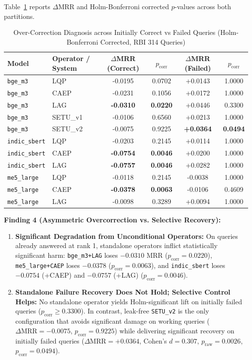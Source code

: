 \documentclass[conference]{IEEEtran}
\begin{document}
Table~\ref{tab:overcorrection} reports $\Delta\text{MRR}$ and Holm-Bonferroni corrected $p$-values across both partitions.

\begin{table}[t]
\caption{Over-Correction Diagnosis across Initially Correct vs Failed Queries (Holm-Bonferroni Corrected, RBI 314 Queries)}
\label{tab:overcorrection}
\centering
\begin{tabular}{llcccc}
\toprule
Model & Operator / System & $\Delta$MRR (Correct) & $p_{\text{corr}}$ & $\Delta$MRR (Failed) & $p_{\text{corr}}$ \\
\midrule
\texttt{bge\_m3} & LQP & -0.0195 & 0.0702 & +0.0143 & 1.0000 \\
\texttt{bge\_m3} & CAEP & -0.0231 & 0.1056 & +0.0172 & 1.0000 \\
\texttt{bge\_m3} & LAG & \textbf{-0.0310} & \textbf{0.0220} & +0.0446 & 0.3300 \\
\texttt{bge\_m3} & SETU\_v1 & -0.0106 & 0.6560 & +0.0213 & 1.0000 \\
\texttt{bge\_m3} & SETU\_v2 & -0.0075 & 0.9225 & \textbf{+0.0364} & \textbf{0.0494} \\
\midrule
\texttt{indic\_sbert} & LQP & -0.0203 & 0.2145 & +0.0114 & 1.0000 \\
\texttt{indic\_sbert} & CAEP & \textbf{-0.0754} & \textbf{0.0046} & +0.0200 & 1.0000 \\
\texttt{indic\_sbert} & LAG & \textbf{-0.0757} & \textbf{0.0046} & +0.0282 & 1.0000 \\
\midrule
\texttt{me5\_large} & LQP & -0.0118 & 0.2145 & -0.0038 & 1.0000 \\
\texttt{me5\_large} & CAEP & \textbf{-0.0378} & \textbf{0.0063} & -0.0106 & 0.4609 \\
\texttt{me5\_large} & LAG & -0.0098 & 0.3289 & +0.0094 & 1.0000 \\
\bottomrule
\end{tabular}
\end{table}

\textbf{Finding 4 (Asymmetric Overcorrection vs. Selective Recovery):}
\begin{enumerate}
    \item \textbf{Significant Degradation from Unconditional Operators:} On queries already answered at rank 1, standalone operators inflict statistically significant harm: \texttt{bge\_m3+LAG} loses $-0.0310$ MRR ($p_{\text{corr}} = 0.0220$), \texttt{me5\_large+CAEP} loses $-0.0378$ ($p_{\text{corr}} = 0.0063$), and \texttt{indic\_sbert} loses $-0.0754$ (+CAEP) and $-0.0757$ (+LAG) ($p_{\text{corr}} = 0.0046$).
    \item \textbf{Standalone Failure Recovery Does Not Hold; Selective Control Helps:} No standalone operator yields Holm-significant lift on initially failed queries ($p_{\text{corr}} \ge 0.3300$). In contrast, leak-free \texttt{SETU\_v2} is the only configuration that avoids significant damage on working queries ($\Delta\text{MRR} = -0.0075$, $p_{\text{corr}} = 0.9225$) while delivering significant recovery on initially failed queries ($\Delta\text{MRR} = +0.0364$, Cohen's $d = 0.307$, $p_{\text{raw}} = 0.0026$, $p_{\text{corr}} = 0.0494$).
\end{enumerate}
\end{document}
